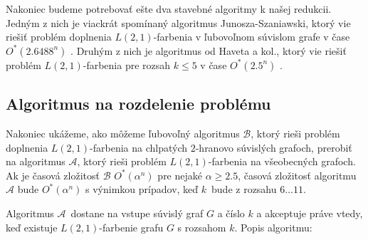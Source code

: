 Nakoniec budeme potrebovať ešte dva stavebné algoritmy k našej redukcii. Jedným z nich je
viackrát spomínaný algoritmus Junosza-Szaniawski, ktorý vie riešiť problém doplnenia $L(2,1)$-farbenia
v ľubovoľnom súvislom grafe v čase $O^*(2.6488^n)$ \cite{junosza_fast}. Druhým z nich je algoritmus od Haveta
a kol., ktorý vie riešiť problém $L(2,1)$-farbenia pre rozsah $k \leq 5$ v čase $O^*(2.5^n)$ \cite{havet}.

\subsection{Algoritmus na rozdelenie problému}

Nakoniec ukážeme, ako môžeme ľubovoľný algoritmus $\mathcal{B}$, ktorý rieši problém doplnenia
$L(2,1)$-farbenia na chlpatých $2$-hranovo súvislých grafoch, prerobiť na algoritmus $\mathcal{A}$, ktorý
rieši problém $L(2,1)$-farbenia na všeobecných grafoch. Ak je časová zložitosť $\mathcal{B}$
$O^*(\alpha^n)$ pre nejaké $\alpha \ge 2.5$, časová zložitosť algoritmu $\mathcal{A}$ bude $O^*(\alpha^n)$
s výnimkou prípadov, keď $k$ bude z rozsahu $6 \ldots 11$.

Algoritmus $\mathcal{A}$ dostane na vstupe súvislý graf $G$ a číslo $k$ a akceptuje práve vtedy,
keď existuje $L(2,1)$-farbenie grafu $G$ s rozsahom $k$. Popis algoritmu:

